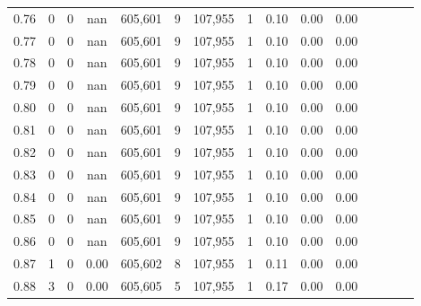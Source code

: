 \begin{tabular}{rrrcrrrrrrrrrrr}
0.76 &        0 &       0 &                                        nan &  605,601 &        9 &  107,955 &        1 &  0.10 &  0.00 &                         0.00 \\
0.77 &        0 &       0 &                                        nan &  605,601 &        9 &  107,955 &        1 &  0.10 &  0.00 &                         0.00 \\
0.78 &        0 &       0 &                                        nan &  605,601 &        9 &  107,955 &        1 &  0.10 &  0.00 &                         0.00 \\
0.79 &        0 &       0 &                                        nan &  605,601 &        9 &  107,955 &        1 &  0.10 &  0.00 &                         0.00 \\
0.80 &        0 &       0 &                                        nan &  605,601 &        9 &  107,955 &        1 &  0.10 &  0.00 &                         0.00 \\
0.81 &        0 &       0 &                                        nan &  605,601 &        9 &  107,955 &        1 &  0.10 &  0.00 &                         0.00 \\
0.82 &        0 &       0 &                                        nan &  605,601 &        9 &  107,955 &        1 &  0.10 &  0.00 &                         0.00 \\
0.83 &        0 &       0 &                                        nan &  605,601 &        9 &  107,955 &        1 &  0.10 &  0.00 &                         0.00 \\
0.84 &        0 &       0 &                                        nan &  605,601 &        9 &  107,955 &        1 &  0.10 &  0.00 &                         0.00 \\
0.85 &        0 &       0 &                                        nan &  605,601 &        9 &  107,955 &        1 &  0.10 &  0.00 &                         0.00 \\
0.86 &        0 &       0 &                                        nan &  605,601 &        9 &  107,955 &        1 &  0.10 &  0.00 &                         0.00 \\
0.87 &        1 &       0 &                                       0.00 &  605,602 &        8 &  107,955 &        1 &  0.11 &  0.00 &                         0.00 \\
0.88 &        3 &       0 &                                       0.00 &  605,605 &        5 &  107,955 &        1 &  0.17 &  0.00 &                         0.00 \\

\end{tabular}
